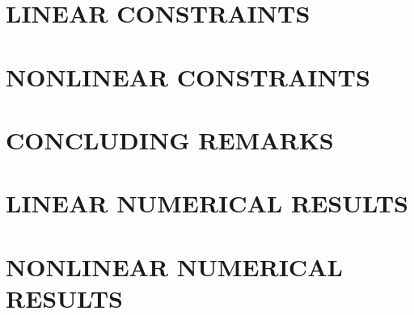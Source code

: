 \documentclass[11pt,letterpaper]{thesis2}
\begin{document}
\chapter{LINEAR CONSTRAINTS}\label{chap:linear}

\chapter{NONLINEAR CONSTRAINTS}\label{chap:general}

\chapter{CONCLUDING REMARKS}\label{chap:conclusion}


\begin{appendix}

\chapter{LINEAR NUMERICAL RESULTS}


\chapter{NONLINEAR NUMERICAL RESULTS}


\end{appendix}




\end{document}
